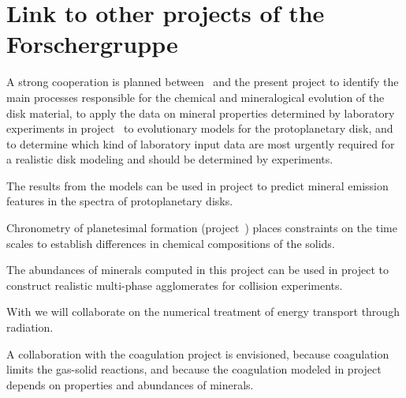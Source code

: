 \section{Link to other projects of the Forschergruppe}
\begin{linkproj}

\item[\projlattard] A strong cooperation is planned between
\projlattard\ and the present project to identify the main
processes responsible for the chemical and mineralogical evolution
of the disk material, to apply the data on mineral properties
determined by laboratory experiments in project \projlattard\ to
evolutionary models for the protoplanetary disk, and to determine
which kind of laboratory input data are most urgently required for
a realistic disk modeling and should be determined by experiments.

\item[\projwolf{}] The results from the models can be used in project
\projwolf{} to predict mineral emission features in the spectra of
protoplanetary disks.
\item[\projtrie{}] Chronometry of planetesimal formation
(project~\projtrie{}) places constraints on the time scales to establish
differences in chemical compositions of the solids.
\item[\projblumtrie{}] The abundances of minerals computed in this
project can be used in project \projblumtrie{} to construct realistic
multi-phase agglomerates for collision experiments.
\item[\projklahr{}] With \projklahr{} we will collaborate on 
the numerical treatment of energy transport through radiation.
\item[\projdul{}] A collaboration with the
coagulation project \projdul{} is envisioned, because coagulation limits the
gas-solid reactions, and because the coagulation modeled in project
\projdul{} depends on properties and abundances of minerals.
\end{linkproj}

